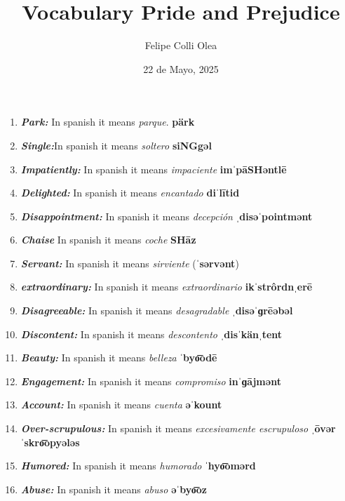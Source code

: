 \documentclass[11pt]{article}
\title{Vocabulary Pride and Prejudice}
\author{Felipe Colli Olea}
\date{22 de Mayo, 2025}
\begin{document}
\maketitle

\begin{enumerate}
    \item \textbf{\textit{Park:}} In spanish it means \textit{parque}.      \textbf{pärk}
    \item \textbf{\textit{Single:}}In spanish it means \textit{soltero}     \textbf{siNGgəl}
    \item \textbf{\textit{Impatiently:}} In spanish it means \textit{impaciente}     \textbf{imˈpāSHəntlē}
    \item \textbf{\textit{Delighted:}} In spanish it means \textit{encantado}    \textbf{diˈlītid}
    \item \textbf{\textit{Disappointment:}} In spanish it means \textit{decepción}   \textbf{ˌdisəˈpointmənt}
    \item \textbf{\textit{Chaise}} In spanish it means \textit{coche}    \textbf{SHāz}
    \item \textbf{\textit{Servant:}} In spanish it means \textit{sirviente} (\textbf{ˈsərvənt})
    \item \textbf{\textit{extraordinary:}} In spanish it means \textit{extraordinario} \textbf{ikˈstrôrdnˌerē}
    \item \textbf{\textit{Disagreeable:}} In spanish it means \textit{desagradable} \textbf{ˌdisəˈɡrēəbəl}
    \item \textbf{\textit{Discontent:}} In spanish it means \textit{descontento} \textbf{ˌdisˈkänˌtent}
    \item \textbf{\textit{Beauty:}} In spanish it means \textit{belleza} \textbf{ˈbyo͞odē}
    \item \textbf{\textit{Engagement:}} In spanish it means \textit{compromiso} \textbf{inˈɡājmənt}
    \item \textbf{\textit{Account:}} In spanish it means \textit{cuenta} \textbf{əˈkount}
    \item \textbf{\textit{Over-scrupulous:}} In spanish it means \textit{excesivamente escrupuloso} \textbf{ˌōvərˈskro͞opyələs}
    \item \textbf{\textit{Humored:}} In spanish it means \textit{humorado} \textbf{ˈhyo͞omərd}
    \item \textbf{\textit{Abuse:}} In spanish it means \textit{abuso} \textbf{əˈbyo͞oz}
\end{enumerate}
\end{document}
